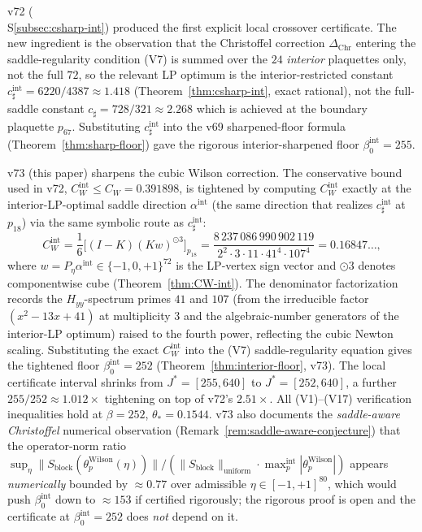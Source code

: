 \documentclass[11pt]{article}
\theoremstyle{definition}
\begin{document}
v72 \textup{(}\\S\ref{subsec:csharp-int}\textup{)} produced the first explicit
local crossover certificate.
The new ingredient is the observation that the Christoffel correction
$\Delta_{\mathrm{Chr}}$ entering the saddle-regularity condition
(V7) is summed over the $24$ \emph{interior} plaquettes only, not the
full $72$, so the relevant LP optimum is the
interior-restricted constant
$c_\sharp^{\mathrm{int}}=6220/4387\approx 1.418$
\textup{(}Theorem~\ref{thm:csharp-int}, exact rational\textup{)},
not the full-saddle constant $c_\sharp=728/321\approx 2.268$
which is achieved at the boundary plaquette $p_{67}$.  Substituting
$c_\sharp^{\mathrm{int}}$ into the v69 sharpened-floor formula
\textup{(}Theorem~\ref{thm:sharp-floor}\textup{)} gave the rigorous
interior-sharpened floor $\beta_0^{\mathrm{int}}=255$.

v73 \textup{(}this paper\textup{)} sharpens the cubic Wilson
correction.  The conservative bound used in v72,
$C_W^{\mathrm{int}}\le C_W=0.391898$, is tightened by computing
$C_W^{\mathrm{int}}$ exactly at the interior-LP-optimal saddle
direction $\alpha^{\mathrm{int}}$ \textup{(}the same direction that
realizes $c_\sharp^{\mathrm{int}}$ at $p_{18}$\textup{)} via the same
symbolic route as $c_\sharp^{\mathrm{int}}$:
\[
C_W^{\mathrm{int}}=\frac{1}{6}\bigl[(I-K)(K w)^{\odot 3}\bigr]_{p_{18}}
=\frac{8\,237\,086\,990\,902\,119}{2^2\cdot 3\cdot 11\cdot 41^4\cdot 107^4}
=0.16847\ldots,
\]
where $w=P_\eta\alpha^{\mathrm{int}}\in\{-1,0,+1\}^{72}$ is the
LP-vertex sign vector and $\odot 3$ denotes componentwise cube
\textup{(}Theorem~\ref{thm:CW-int}\textup{)}.  The denominator
factorization records the $H_{yy}$-spectrum primes $41$ and $107$
\textup{(}from the irreducible factor $(x^2-13x+41)$ at multiplicity
$3$ and the algebraic-number generators of the interior-LP
optimum\textup{)} raised to the fourth power, reflecting the cubic
Newton scaling.  Substituting the exact $C_W^{\mathrm{int}}$ into the
(V7) saddle-regularity equation gives the tightened floor
$\beta_0^{\mathrm{int}}=252$ \textup{(}Theorem~\ref{thm:interior-floor},
v73\textup{)}.  The local certificate interval
shrinks from $J^*=[255,640]$ to $J^*=[252,640]$, a further
$255/252\approx 1.012\times$ tightening on top of v72's $2.51\times$.
All \textup{(V1)--(V17)} verification inequalities hold at
$\beta=252$, $\theta_*=0.1544$.  v73 also documents the
\emph{saddle-aware Christoffel} numerical observation
\textup{(}Remark~\ref{rem:saddle-aware-conjecture}\textup{)} that the
operator-norm ratio
$\sup_\eta\|S_{\mathrm{block}}(\theta_p^{\mathrm{Wilson}}(\eta))\|/
(\|S_{\mathrm{block}}\|_{\mathrm{uniform}}\cdot\max_p^{\mathrm{int}}|\theta_p^{\mathrm{Wilson}}|)$
appears \emph{numerically} bounded by $\approx 0.77$ over admissible
$\eta\in[-1,+1]^{80}$, which would push $\beta_0^{\mathrm{int}}$ down
to $\approx 153$ if certified rigorously; the rigorous proof is open
and the certificate at $\beta_0^{\mathrm{int}}=252$ does \emph{not}
depend on it.
\end{document}
